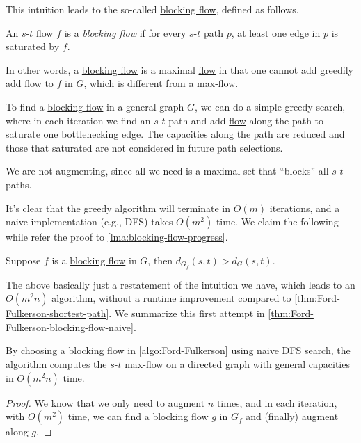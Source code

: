 This intuition leads to the so-called \hyperref[def:blocking-flow]{blocking flow}, defined as follows.

\begin{definition}\label{def:blocking-flow}
	An \(s\)-\(t\) \hyperref[def:flow]{flow} \(f\) is a \emph{blocking flow} if for every \(s\)-\(t\) path \(p\), at least one edge in \(p\) is saturated by \(f\).
\end{definition}

\begin{note}
	In other words, a \hyperref[def:blocking-flow]{blocking flow} is a maximal \hyperref[def:flow]{flow} in that one cannot add greedily add \hyperref[def:flow]{flow} to \(f\) in \(G\), which is different from a \hyperref[prb:s-t-max-flow]{max-flow}.
\end{note}

To find a \hyperref[def:blocking-flow]{blocking flow} in a general graph \(G\), we can do a simple greedy search, where in each iteration we find an \(s\)-\(t\) path and add \hyperref[def:flow]{flow} along the path to saturate one bottlenecking edge. The capacities along the path are reduced and those that saturated are not considered in future path selections.

\begin{intuition}
	We are not augmenting, since all we need is a maximal set that ``blocks'' all \(s\)-\(t\) paths.
\end{intuition}

It's clear that the greedy algorithm will terminate in \(O(m)\) iterations, and a naive implementation (e.g., DFS) takes \(O(m^2)\) time. We claim the following while refer the proof to \autoref{lma:blocking-flow-progress}.

\begin{claim}
	Suppose \(f\) is a \hyperref[def:blocking-flow]{blocking flow} in \(G\), then \(d_{G_f}(s, t) > d_{G}(s, t)\).
\end{claim}

The above basically just a restatement of the intuition we have, which leads to an \(O(m^2 n)\) algorithm, without a runtime improvement compared to \autoref{thm:Ford-Fulkerson-shortest-path}. We summarize this first attempt in \autoref{thm:Ford-Fulkerson-blocking-flow-naive}.

\begin{theorem}\label{thm:Ford-Fulkerson-blocking-flow-naive}
	By choosing a \hyperref[def:blocking-flow]{blocking flow} in \autoref{algo:Ford-Fulkerson} using naive DFS search, the algorithm computes the \hyperref[prb:s-t-max-flow]{\(s\)-\(t\) max-flow} on a directed graph with general capacities in \(O(m^2n)\) time.
\end{theorem}
\begin{proof}
	We know that we only need to augment \(n\) times, and in each iteration, with \(O(m^2)\) time, we can find a \hyperref[def:blocking-flow]{blocking flow} \(g\) in \(G_f\) and (finally) augment along \(g\).
\end{proof}

